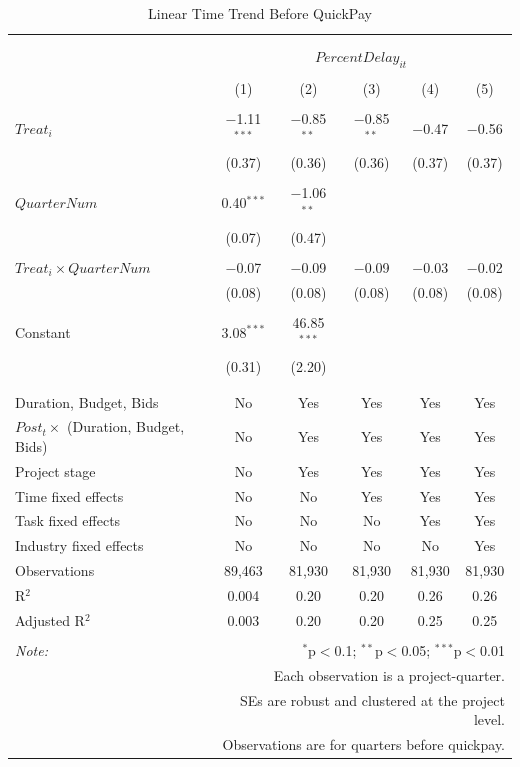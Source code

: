 \documentclass[
]{article}
\begin{document}
\begin{table}[H] \centering 
  \caption{Linear Time Trend Before QuickPay} 
  \label{} 
\small 
\begin{tabular}{@{\extracolsep{-2pt}}lccccc} 
\\[-1.8ex]\hline 
\hline \\[-1.8ex] 
\\[-1.8ex] & \multicolumn{5}{c}{$PercentDelay_{it}$} \\ 
\\[-1.8ex] & (1) & (2) & (3) & (4) & (5)\\ 
\hline \\[-1.8ex] 
 $Treat_i$ & $-$1.11$^{***}$ & $-$0.85$^{**}$ & $-$0.85$^{**}$ & $-$0.47 & $-$0.56 \\ 
  & (0.37) & (0.36) & (0.36) & (0.37) & (0.37) \\ 
  & & & & & \\ 
 $QuarterNum$ & 0.40$^{***}$ & $-$1.06$^{**}$ &  &  &  \\ 
  & (0.07) & (0.47) &  &  &  \\ 
  & & & & & \\ 
 $Treat_i \times QuarterNum$ & $-$0.07 & $-$0.09 & $-$0.09 & $-$0.03 & $-$0.02 \\ 
  & (0.08) & (0.08) & (0.08) & (0.08) & (0.08) \\ 
  & & & & & \\ 
 Constant & 3.08$^{***}$ & 46.85$^{***}$ &  &  &  \\ 
  & (0.31) & (2.20) &  &  &  \\ 
  & & & & & \\ 
\hline \\[-1.8ex] 
Duration, Budget, Bids & No & Yes & Yes & Yes & Yes \\ 
$Post_t \times$  (Duration, Budget, Bids) & No & Yes & Yes & Yes & Yes \\ 
Project stage & No & Yes & Yes & Yes & Yes \\ 
Time fixed effects & No & No & Yes & Yes & Yes \\ 
Task fixed effects & No & No & No & Yes & Yes \\ 
Industry fixed effects & No & No & No & No & Yes \\ 
Observations & 89,463 & 81,930 & 81,930 & 81,930 & 81,930 \\ 
R$^{2}$ & 0.004 & 0.20 & 0.20 & 0.26 & 0.26 \\ 
Adjusted R$^{2}$ & 0.003 & 0.20 & 0.20 & 0.25 & 0.25 \\ 
\hline 
\hline \\[-1.8ex] 
\textit{Note:}  & \multicolumn{5}{r}{$^{*}$p$<$0.1; $^{**}$p$<$0.05; $^{***}$p$<$0.01} \\ 
 & \multicolumn{5}{r}{Each observation is a project-quarter.} \\ 
 & \multicolumn{5}{r}{SEs are robust and clustered at the project level.} \\ 
 & \multicolumn{5}{r}{Observations are for quarters before quickpay.} \\ 
\end{tabular} 
\end{table}
\end{document}
